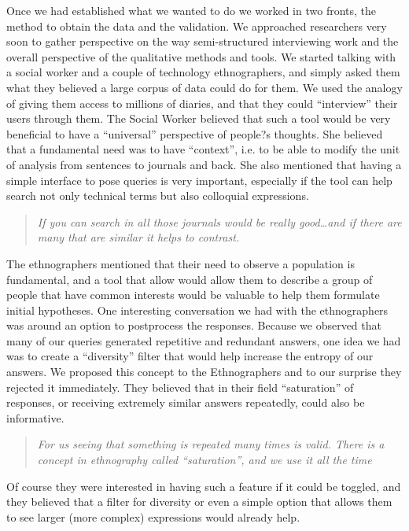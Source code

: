 \documentclass{sigchi}
\begin{document}
Once we had established what we wanted to do we worked in two fronts, the method to obtain the data and the validation. We approached researchers very soon to gather perspective on the way semi-structured interviewing work and the overall perspective of the qualitative methods and tools. We started talking with a social worker and a couple of technology ethnographers, and simply asked them what they believed a large corpus of data could do for them. We used the analogy of giving them access to millions of diaries, and that they could ``interview'' their users through them. The Social Worker believed that such a tool would be very beneficial to have a ``universal'' perspective of people?s thoughts. She believed that a fundamental need was to have ``context'', i.e. to be able to modify the unit of analysis from sentences to journals and back. She also mentioned that having a simple interface to pose queries is very important, especially if the tool can help search not only technical terms but also colloquial expressions. 

\begin{quote}
{\em
If you can search in all those journals would be really good\dots and if there are many that are similar it helps to contrast. 
}\end{quote}

The ethnographers mentioned that their need to observe a population is fundamental, and a tool that allow would allow them to describe a group of people that have common interests would be valuable to help them formulate initial hypotheses. One interesting conversation we had with the ethnographers was around an option to postprocess the responses. Because we observed that many of our queries generated repetitive and redundant answers, one idea we had was to create a ``diversity'' filter that would help increase the entropy of our answers. We proposed this concept to the Ethnographers and to our surprise they rejected it immediately. They believed that in their field ``saturation'' of responses, or receiving extremely similar answers repeatedly, could also be informative.

\begin{quote}
{\em
For us seeing that something is repeated many times is valid. There is a concept in ethnography called ``saturation'', and we use it all the time
}\end{quote}

Of course they were interested in having such a feature if it could be toggled, and they believed that a filter for diversity or even a simple option that allows them to see larger (more complex) expressions would already help.
\end{document}
